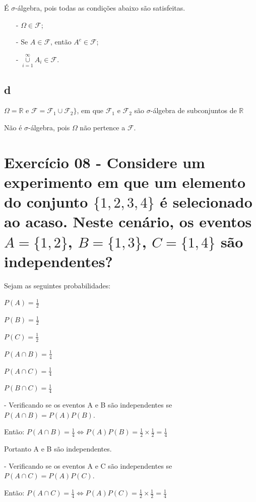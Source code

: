\documentclass[12pt]{article}
\begin{document}
É $\sigma$-álgebra, pois todas as condições abaixo são satisfeitas.

\begin{itemize}
\item[-] $\Omega \in \mathcal{F}$;
\item[-] Se $A \in \mathcal{F}$, então $A^c \in \mathcal{F}$;
\item[-] $\overset{\infty}{\underset{i=1}{\cup}} A_i \in \mathcal{F}$.
\end{itemize}

\subsection*{d}
$\Omega = \mathbb{R}$ e $\mathcal{F}=\mathcal{F_1} \cup \mathcal{F_2} \}$, em que $\mathcal{F_1}$ e $\mathcal{F_2}$ são $\sigma$-álgebra de subconjuntos de $\mathbb{R}$

Não é $\sigma$-álgebra, pois $\Omega$ não pertence a $\mathcal{F}$.

\section*{Exercício 08 - Considere um experimento em que um elemento do conjunto $\{1,2,3,4\}$ é selecionado ao acaso. Neste cenário, os eventos $A=\{1,2\}$, $B=\{1,3\}$, $C=\{1,4\}$ são independentes?}

Sejam as seguintes probabilidades:

$\displaystyle P(A)=\frac{1}{2}$

$\displaystyle P(B)=\frac{1}{2}$

$\displaystyle P(C)=\frac{1}{2}$

$\displaystyle P(A \cap B)=\frac{1}{4}$

$\displaystyle P(A \cap C)=\frac{1}{4}$

$\displaystyle P(B \cap C)=\frac{1}{4}$ \bigskip

- Verificando se os eventos A e B são independentes se $\displaystyle P(A \cap B)=P(A)P(B)$.

Então: $\displaystyle P(A \cap B)=\frac{1}{4} \Longleftrightarrow P(A)P(B)=\frac{1}{2} \times \frac{1}{2} =\frac{1}{4}$

Portanto A e B são independentes. \bigskip

- Verificando se os eventos A e C são independentes se $\displaystyle P(A \cap C)=P(A)P(C)$.

Então: $\displaystyle P(A \cap C)=\frac{1}{4} \Longleftrightarrow P(A)P(C)=\frac{1}{2} \times \frac{1}{2} =\frac{1}{4}$
\end{document}
